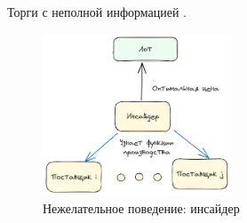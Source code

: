 Торги с неполной информацией \cite{milgrom1982value}.


\begin{figure}[h]
    \centering
    \includegraphics[width=0.5\textwidth]{assets/settings/insider.excalidraw.png}
    \caption{Нежелательное поведение: инсайдер }
\end{figure}

